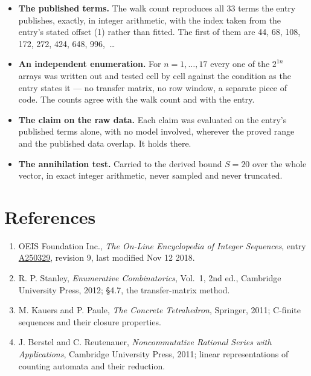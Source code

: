 \documentclass[11pt]{article}
\theoremstyle{definition}
\begin{document}
\begin{itemize}

\item {\bfseries The published terms.} The walk count reproduces all 33 terms the entry publishes, exactly, in integer arithmetic, with the index taken from the entry's stated offset (1) rather than fitted. The first of them are 44, 68, 108, 172, 272, 424, 648, 996,~\dots

\item {\bfseries An independent enumeration.} For $n = 1,\dots,17$ every one of the $2^{1n}$ arrays was written out and tested cell by cell against the condition as the entry states it --- no transfer matrix, no row window, a separate piece of code. The counts agree with the walk count and with the entry.

\item {\bfseries The claim on the raw data.} Each claim was evaluated on the entry's published terms alone, with no model involved, wherever the proved range and the published data overlap. It holds there.

\item {\bfseries The annihilation test.} Carried to the derived bound $S = 20$ over the whole vector, in exact integer arithmetic, never sampled and never truncated.

\end{itemize}

\section{References}

\begin{enumerate}

\item OEIS Foundation Inc., \emph{The On-Line Encyclopedia of Integer Sequences}, entry \href{https://oeis.org/A250329}{A250329}, revision 9, last modified Nov 12 2018.

\item R. P. Stanley, \emph{Enumerative Combinatorics}, Vol.~1, 2nd ed., Cambridge University Press, 2012; \S4.7, the transfer-matrix method.

\item M. Kauers and P. Paule, \emph{The Concrete Tetrahedron}, Springer, 2011; C-finite sequences and their closure properties.

\item J. Berstel and C. Reutenauer, \emph{Noncommutative Rational Series with Applications}, Cambridge University Press, 2011; linear representations of counting automata and their reduction.

\end{enumerate}
\end{document}
